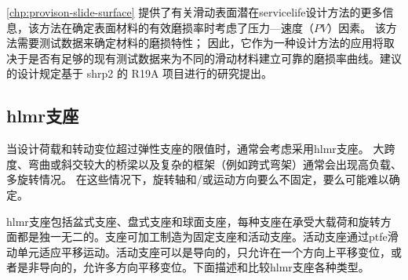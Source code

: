 
\cref{chp:provison-slide-surface} 提供了有关滑动表面潜在\gls*{servicelife}设计方法的更多信息，该方法在确定表面材料的有效磨损率时考虑了压力—速度（$PV$）因素。 该方法需要测试数据来确定材料的磨损特性； 因此，它作为一种设计方法的应用将取决于是否有足够的现有测试数据来为不同的滑动材料建立可靠的磨损率曲线。建议的设计规定基于 \acrshort*{shrp}2 的 R19A 项目进行的研究\cite{ala2016p}提出。

\subsection{\texorpdfstring{\acrfull*{hlmr}}{大承载力多向转动（HLMR）}支座}

当设计荷载和转动变位超过弹性支座的限值时，通常会考虑采用\acrlong*{hlmr}支座。 大跨度、弯曲或斜交较大的桥梁以及复杂的框架（例如跨式弯架）通常会出现高负载、多旋转情况。 在这些情况下，旋转轴和/或运动方向要么不固定，要么可能难以确定。

\acrlong*{hlmr}支座包括盆式支座、盘式支座和球面支座，每种支座在承受大载荷和旋转方面都是独一无二的。支座可加工制造为固定支座和活动支座。活动支座通过\acrlong*{ptfe}滑动单元适应平移运动。活动支座可以是导向的，只允许在一个方向上平移变位，或者是非导向的，允许多方向平移变位。下面描述和比较\acrlong*{hlmr}支座各种类型。

